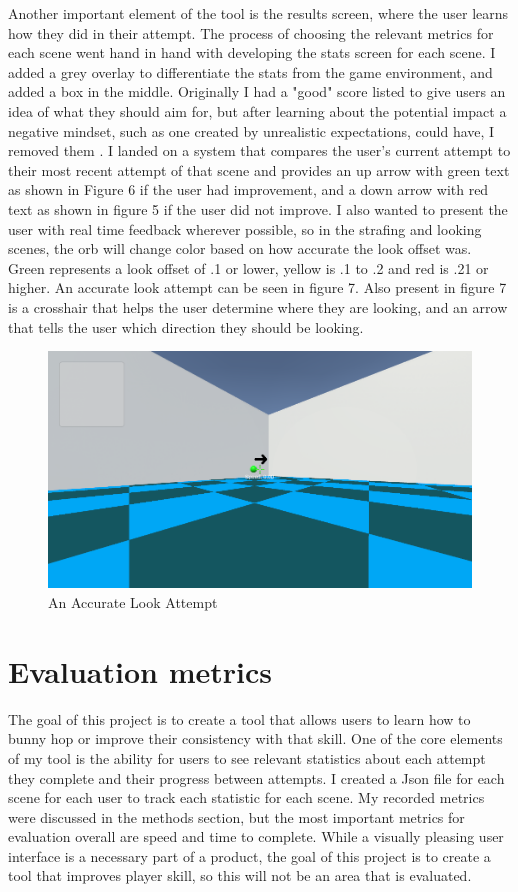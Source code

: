 \documentclass[10pt,twocolumn]{article}
\begin{document}
Another important element of the tool is the results screen, where the user learns how they did in their attempt. The process of choosing the relevant metrics for each scene went hand in hand with developing the stats screen for each scene. I added a grey overlay to differentiate the stats from the game environment, and added a box in the middle. Originally I had a "good" score listed to give users an idea of what they should aim for, but after learning about the potential impact a negative mindset, such as one created by unrealistic expectations, could have, I removed them \cite{learningOptimal}. I landed on a system that compares the user's current attempt to their most recent attempt of that scene and provides an up arrow with green text as shown in Figure 6 if the user had improvement, and a down arrow with red text as shown in figure 5 if the user did not improve. I also wanted to present the user with real time feedback wherever possible, so in the strafing and looking scenes, the orb will change color based on how accurate the look offset was. Green represents a look offset of .1 or lower, yellow is .1 to .2 and red is .21 or higher. An accurate look attempt can be seen in figure 7. Also present in figure 7 is a crosshair that helps the user determine where they are looking, and an arrow that tells the user which direction they should be looking. 
\begin{figure}
    \centering
    \includegraphics[width=1\linewidth]{greenOrb.png}
    \caption{An Accurate Look Attempt}
\end{figure}

\section{Evaluation metrics}

The goal of this project is to create a tool that allows users to learn how to bunny hop or improve their consistency with that skill. One of the core elements of my tool is the ability for users to see relevant statistics about each attempt they complete and their progress between attempts. I created a Json file for each scene for each user to track each statistic for each scene. My recorded metrics were discussed in the methods section, but the most important metrics for evaluation overall are speed and time to complete. While a visually pleasing user interface is a necessary part of a product, the goal of this project is to create a tool that improves player skill, so this will not be an area that is evaluated.
\end{document}
